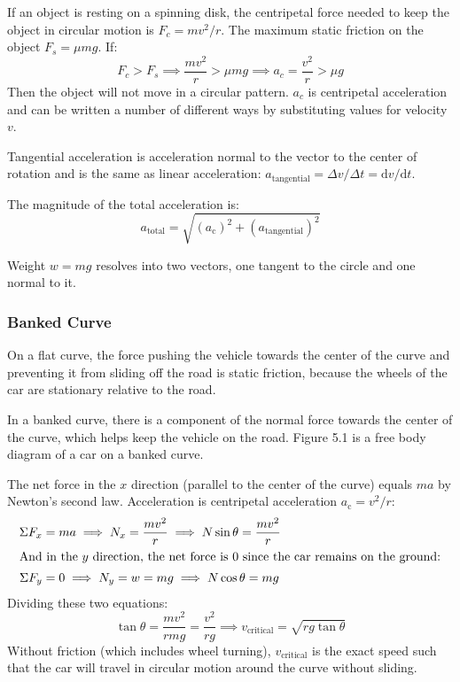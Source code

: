 \documentclass{article}
\begin{document}
If an object is resting on a spinning disk, the centripetal force needed to keep the object in circular motion is $F_c=mv^2/r$. The maximum static friction on the object $F_s=\mu mg$. If:
\begin{equation*}
    F_c>F_s
	\implies \frac{mv^2}{r}>\mu mg
	\implies a_c=\frac{v^2}{r}>\mu g
\end{equation*}
Then the object will not move in a circular pattern. $a_c$ is centripetal acceleration and can be written a number of different ways by substituting values for velocity $v$.

Tangential acceleration is acceleration normal to the vector to the center of rotation and is the same as linear acceleration: $a_\text{tangential}=\Delta v/\Delta t= \mathrm{d}v/\mathrm{d}t$.

The magnitude of the total acceleration is:
\begin{equation*}
	a_ \text{total}=\sqrt{(a_\text{c})^2+(a_ \text{tangential})^2}
\end{equation*}

Weight $w=mg$ resolves into two vectors, one tangent to the circle and one normal to it.

\subsubsection{Banked Curve}

On a flat curve, the force pushing the vehicle towards the center of the curve and preventing it from sliding off the road is static friction, because the wheels of the car are stationary relative to the road.

In a banked curve, there is a component of the normal force towards the center of the curve, which helps keep the vehicle on the road. Figure 5.1 is a free body diagram of a car on a banked curve.

The net force in the $x$ direction (parallel to the center of the curve) equals $ma$ by Newton's second law. Acceleration is centripetal acceleration $a_ \text{c}=v^2/r$:
\begin{align*}
	\Sigma F_x&=ma
	\implies N_x=\frac{mv^2}{r}
	\implies N\sin\theta=\frac{mv^2}{r} \\
	\intertext{And in the $y$ direction, the net force is $0$ since the car remains on the ground:}
	\Sigma F_y&=0
	\implies N_y=w=mg
	\implies N\cos\theta=mg
\end{align*}
Dividing these two equations:
\begin{equation*}
    \tan\theta=\frac{mv^2}{rmg}=\frac{v^2}{rg}
	\implies v_ \text{critical}= \sqrt{rg\tan\theta}
\end{equation*}
Without friction (which includes wheel turning), $v_ \text{critical}$ is the exact speed such that the car will travel in circular motion around the curve without sliding.
\end{document}
